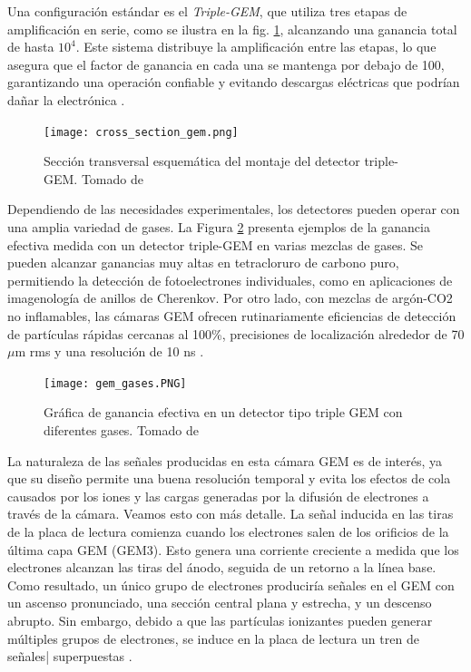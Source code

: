 \documentclass{article}
\begin{document}
\noindent Una configuración estándar es el \textit{Triple-GEM}, que utiliza tres etapas de amplificación en serie, como se ilustra en la fig. \ref{fig:cross_section}, alcanzando una ganancia total de hasta $10^4$. Este sistema distribuye la amplificación entre las etapas, lo que asegura que el factor de ganancia en cada una se mantenga por debajo de 100, garantizando una operación confiable y evitando descargas eléctricas que podrían dañar la electrónica \cite{bencivenni2002triple}.\\

\begin{figure}[H]
    \centering
    \texttt{[image: cross\_section\_gem.png]}
    \caption{Sección transversal esquemática del montaje del detector triple-GEM. Tomado de \cite{cross}}
    \label{fig:cross_section}
\end{figure}

\noindent Dependiendo de las necesidades experimentales, los detectores pueden operar con una amplia variedad de gases. La Figura \ref{fig:gem_gases} presenta ejemplos de la ganancia efectiva medida con un detector triple-GEM en varias mezclas de gases. Se pueden alcanzar ganancias muy altas en tetracloruro de carbono puro, permitiendo la detección de fotoelectrones individuales, como en aplicaciones de imagenología de anillos de Cherenkov. Por otro lado, con mezclas de argón-CO2 no inflamables, las cámaras GEM ofrecen rutinariamente eficiencias de detección de partículas rápidas cercanas al 100\%, precisiones de localización alrededor de 70 $\mu$m rms y una resolución de 10 ns \cite{ketzer2004performance}.

\begin{figure}[H]
    \centering
    \texttt{[image: gem\_gases.PNG]}
    \caption{Gráfica de ganancia efectiva en un detector tipo triple GEM con diferentes gases. Tomado de \cite{breskin2002gem}}
    \label{fig:gem_gases}
\end{figure}

\noindent La naturaleza de las señales producidas en esta cámara GEM es de interés, ya que su diseño permite una buena resolución temporal y evita los efectos de cola causados por los iones y las cargas generadas por la difusión de electrones a través de la cámara. Veamos esto con más detalle. La señal inducida en las tiras de la placa de lectura comienza cuando los electrones salen de los orificios de la última capa GEM (GEM3). Esto genera una corriente creciente a medida que los electrones alcanzan las tiras del ánodo, seguida de un retorno a la línea base. Como resultado, un único grupo de electrones produciría señales en el GEM con un ascenso pronunciado, una sección central plana y estrecha, y un descenso abrupto. Sin embargo, debido a que las partículas ionizantes pueden generar múltiples grupos de electrones, se induce en la placa de lectura un tren de señales| superpuestas \cite{mocellin2021performance}.\\
\end{document}

